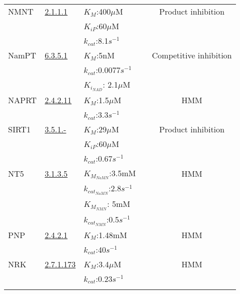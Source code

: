 \documentclass[a4paper,10pt]{article}
\begin{document}
\begin{longtable}{p{1.5cm}p{1.5cm}p{2.5cm}cc}
    \\ \hline
NMNT & \href{http://www.chem.qmul.ac.uk/iubmb/enzyme/EC2/1/1/1.html}{2.1.1.1}
&$K_M$:400$\mu$M  & \cite{Aksoy1994} & Product inhibition\\
& & $K_{iP}$:60$\mu$M  & &
    \\
    & & $k_{cat}$:8.1$s^{-1}$  & \cite{Alston1988}&
    \\  \hline
NamPT & \href{http://www.chem.qmul.ac.uk/iubmb/enzyme/EC6/3/5/1.html}{6.3.5.1}
&$K_M$:5nM  & \cite{Burgos2008} & Competitive inhibition\\
    & & $k_{cat}$:0.0077$s^{-1}$  & &
    \\
     & & $K_{i_{NAD}}$:  2.1$\mu$M& &
    \\  \hline
    NAPRT &
       \href{http://www.chem.qmul.ac.uk/iubmb/enzyme/EC2/4/2/11.html}{2.4.2.11}
    &$K_M$:1.5$\mu$M  & \cite{Burgos2008} & HMM\\
    & & $k_{cat}$:3.3$s^{-1}$  & &
    \\  \hline
    SIRT1 &
    \href{http://www.chem.qmul.ac.uk/iubmb/enzyme/EC3/5/1/index.html}{3.5.1.-}
    &$K_M$:29$\mu$M  & \cite{Borra2004} & Product inhibition\\
    & & $K_{iP}$:60$\mu$M  & &
    \\
    & & $k_{cat}$:0.67$s^{-1}$  & &
    \\  \hline
    NT5 &
    \href{http://www.chem.qmul.ac.uk/iubmb/enzyme/EC3/1/3/5.html}{3.1.3.5}
    &$K_{M_{NaMN}}$:3.5mM  & \cite{Kulikova2015} & HMM \\
    & & $k_{{cat}_{NaMN}}$:2.8$s^{-1}$
    & & \\
    & &$K_{M_{NMN}}$: 5mM   &  \\
     & & $k_{{cat}_{NMN}}$:0.5$s^{-1}$
     & & \\  \hline
     PNP &
    \href{http://www.chem.qmul.ac.uk/iubmb/enzyme/EC3/2/4/2.html}{2.4.2.1}
    &$K_M$:1.48mM  & \cite{Wielgus-Kutrowska1997} & HMM \\
    & & $k_{cat}$:40$s^{-1}$
    & & \\  \hline
    NRK &
    \href{http://www.chem.qmul.ac.uk/iubmb/enzyme/EC2/7/1/173.html}{2.7.1.173}
    &$K_M$:3.4$\mu$M & \cite{Dolle2009} & HMM \\
    & & $k_{cat}$:0.23$s^{-1}$
    & & \\  \hline
  \bottomrule
  \label{tab:kinetic}

\end{longtable}
\end{document}
